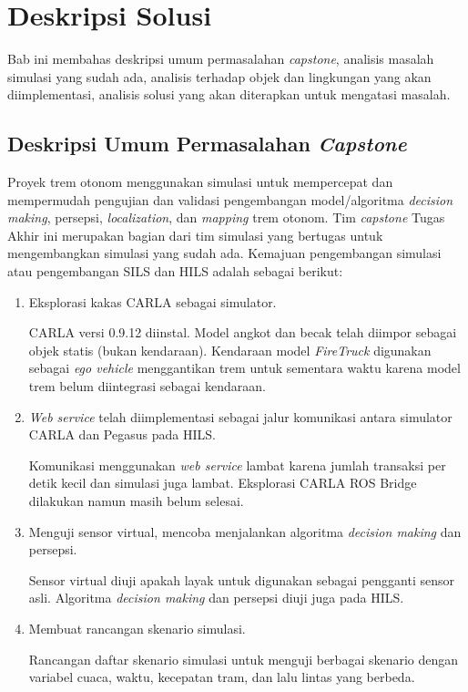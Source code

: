 \chapter{Deskripsi Solusi}
\label{chapter-3}

Bab ini membahas deskripsi umum permasalahan \textit{capstone}, analisis masalah
simulasi yang sudah ada, analisis terhadap objek dan lingkungan yang akan
diimplementasi, analisis solusi yang akan diterapkan untuk mengatasi masalah.

\section{Deskripsi Umum Permasalahan \textit{Capstone}}

Proyek trem otonom menggunakan simulasi untuk mempercepat dan mempermudah
pengujian dan validasi pengembangan model/algoritma \textit{decision making},
persepsi, \textit{localization}, dan \textit{mapping} trem otonom. Tim
\textit{capstone} Tugas Akhir ini merupakan bagian dari tim simulasi yang
bertugas untuk mengembangkan simulasi yang sudah ada. Kemajuan
pengembangan simulasi atau pengembangan SILS dan HILS adalah sebagai berikut:

\begin{enumerate}

	\item Eksplorasi kakas CARLA sebagai simulator.

	CARLA versi 0.9.12 diinstal. Model angkot dan becak telah diimpor
	sebagai objek statis (bukan kendaraan). Kendaraan model \textit{FireTruck}
	digunakan sebagai \textit{ego vehicle} menggantikan trem untuk sementara
	waktu karena model trem belum diintegrasi sebagai kendaraan.

	\item \textit{Web service} telah diimplementasi sebagai jalur komunikasi
	antara simulator CARLA dan Pegasus pada HILS.

	Komunikasi menggunakan \textit{web service} lambat karena jumlah transaksi
	per detik kecil dan simulasi juga lambat. Eksplorasi CARLA ROS Bridge
	dilakukan namun masih belum selesai.

	\item Menguji sensor virtual, mencoba menjalankan algoritma \textit{decision
	making} dan persepsi.

	Sensor virtual diuji apakah layak untuk digunakan sebagai pengganti sensor
	asli. Algoritma \textit{decision making} dan persepsi diuji juga pada HILS.

	\item Membuat rancangan skenario simulasi.

	Rancangan daftar skenario simulasi untuk menguji berbagai skenario dengan
	variabel cuaca, waktu, kecepatan tram, dan lalu lintas yang berbeda.

\end{enumerate}

